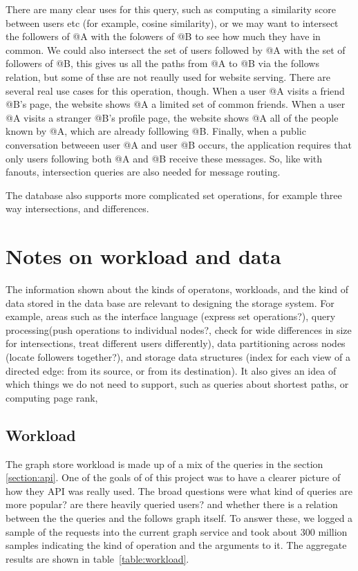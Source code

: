There are many clear uses for this query, such as computing a similarity score between users etc (for example, cosine similarity), or we may want to intersect the followers of @A with the folowers of @B to see how much they have in common. We could also intersect the set of users followed by @A with the set of followers of @B, this gives us all the paths from @A to @B via the follows relation, but some of thse are not reaully used for website serving.  There are several real use cases for this operation, though. When a user @A visits a friend  @B's page, the website shows @A a limited set of common friends.  When a user @A visits a stranger @B's profile page, the website shows @A all of the people known by @A, which are already folllowing @B.  Finally, when a public conversation betweeen user @A and user @B occurs, the application  requires that only users following both @A and @B  receive these messages. So, like with fanouts, intersection queries are also needed for message routing.

The database also supports more complicated set operations, for example three way intersections, and differences.

\section{Notes on workload and data}

The information shown about the kinds of operatons, workloads, and the kind of data stored in the data base are relevant to designing the storage system.  For example,  areas such as the interface language (express set operations?), query processing(push operations to individual nodes?, check for wide differences in size for intersections, treat different users differently), data partitioning  across nodes (locate followers together?), and storage data structures (index for each view of a directed edge: from its source, or  from its destination). It also gives an idea of which things we do not need to support, such as queries about shortest paths, or computing page rank, 

\subsection{Workload}
\label{section:workload}
The graph store workload is made up of a mix of the queries in the section \ref{section:api}. One of the goals of of this project was to have a clearer picture of how they API was really used.  The broad questions were what kind of queries are more popular? are there heavily queried users? and whether  there is a relation between the the queries and the follows graph itself.  To answer these, we logged a sample of the requests into the current graph service and took about 300 million samples indicating the kind of operation and the arguments to it. The aggregate results are shown in table~\ref{table:workload}.

